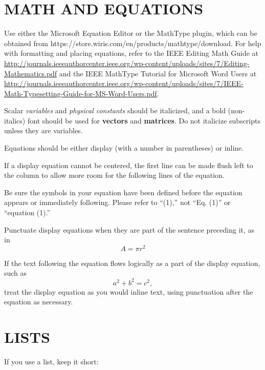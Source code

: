 \documentclass{IEEEcsmag}
\begin{document}
\section{MATH AND EQUATIONS}

Use either the Microsoft Equation Editor or the MathType plugin, which can be obtained from https://store.wiris.com/en/products/mathtype/download. For help with formatting and placing equations, refer to the IEEE Editing Math Guide at \url{http://journals.ieeeauthorcenter.ieee.org/wp-content/uploads/sites/7/Editing-Mathematics.pdf} and the IEEE MathType Tutorial for Microsoft Word Users at \url{http://journals.ieeeauthorcenter.ieee.org/wp-content/uploads/sites/7/IEEE-Math-Typesetting-Guide-for-MS-Word-Users.pdf}.


Scalar {\it variables} and {\it physical constants} should be italicized, and a bold (non-italics) font should be used for {\bf vectors} and {\bf matrices}. Do not italicize subscripts unless they are variables.

Equations should be either display (with a number in parentheses) or inline.   

If a display equation cannot be centered, the first line can be made flush left to the column to allow more room for the following lines of the equation.


Be sure the symbols in your equation have been defined before the equation appears or immediately following. Please refer to ``(1),'' not ``Eq. (1)'' or ``equation (1).''

Punctuate display equations when they are part of the sentence preceding it, as in
\begin{equation}
A=\pi r^2
\end{equation}

If the text following the equation flows logically as a part of the display equation, such as
\begin{equation}
a^2 + b^2 = c^2, 
\end{equation}
treat the display equation as you would inline text, using punctuation after the equation as necessary.\vspace*{3.5pt}

\section{LISTS}

If you use a list, keep it short:
\end{document}
